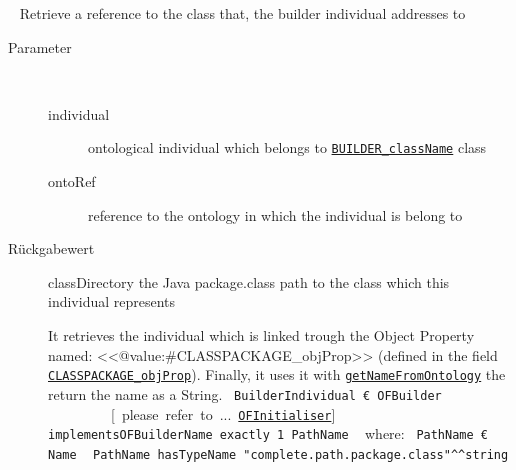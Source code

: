 \begin{description}
~ Retrieve a reference to the class that, the builder individual addresses to
\begin{description}
\item[Parameter] ~
\begin{description}
\item[individual]
ontological individual which belongs to \texttt{\hyperlink{ontologyFramework.OFRunning.OFInitialising.OFInitialiser.BUILDER_className}{BUILDER_className}} class
\item[ontoRef]
reference to the ontology in which the individual is belong to
\end{description}
\item[Rückgabewert] 
classDirectory the Java package.class path to the class which this individual represents
 
 It retrieves the individual which is linked trough the Object Property named: <<@value:#CLASSPACKAGE_objProp>>
 (defined in the field \texttt{\hyperlink{ontologyFramework.OFRunning.OFInitialising.OFBuilderCommon.CLASSPACKAGE_objProp}{CLASSPACKAGE_objProp}}). Finally, it uses it with
 \texttt{\hyperlink{ontologyFramework.OFDataMapping.ReservatedDataType.NameMapper.getNameFromOntology(org.semanticweb.owlapi.model.OWLNamedIndividual,ontologyFramework.OFContextManagement.OWLReferences)}{getNameFromOntology}}
 the return the name as a String.
 {\ttfamily
\mbox{ }\verb!BuilderIndividual € OFBuilder !\mbox{ }\mbox{ }\mbox{ }\mbox{ }\mbox{ }\mbox{ }\mbox{ }\mbox{ }\mbox{ }[\mbox{ }please\mbox{ }refer\mbox{ }to\mbox{ }...\mbox{ }\texttt{\hyperlink{ontologyFramework.OFRunning.OFInitialising.OFInitialiser-class}{OFInitialiser}}]\mbox{}\newline
\mbox{ }		\verb!implementsOFBuilderName exactly 1 PathName!\mbox{}\newline
\mbox{ }			where:\mbox{ }	\verb!PathName € Name!\mbox{}\newline
\mbox{ }						\verb!PathName hasTypeName "complete.path.package.class"^^string!\mbox{}\newline
\mbox{ }\mbox{ }}


\end{description}
\end{description}
